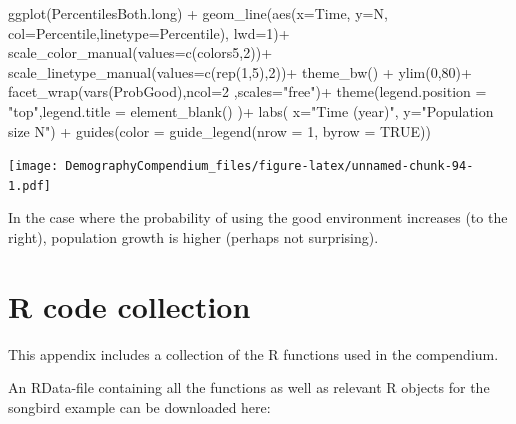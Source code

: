 \documentclass[
]{book}
\newenvironment{Shaded}{\begin{snugshade}}{\end{snugshade}}
\newcommand{\AttributeTok}[1]{\textcolor[rgb]{0.77,0.63,0.00}{#1}}
\newcommand{\ConstantTok}[1]{\textcolor[rgb]{0.00,0.00,0.00}{#1}}
\newcommand{\DecValTok}[1]{\textcolor[rgb]{0.00,0.00,0.81}{#1}}
\newcommand{\FunctionTok}[1]{\textcolor[rgb]{0.00,0.00,0.00}{#1}}
\newcommand{\NormalTok}[1]{#1}
\newcommand{\SpecialCharTok}[1]{\textcolor[rgb]{0.00,0.00,0.00}{#1}}
\newcommand{\StringTok}[1]{\textcolor[rgb]{0.31,0.60,0.02}{#1}}
\begin{document}
\begin{Shaded}
\begin{Highlighting}[]
\FunctionTok{ggplot}\NormalTok{(PercentilesBoth.long) }\SpecialCharTok{+} 
  \FunctionTok{geom\_line}\NormalTok{(}\FunctionTok{aes}\NormalTok{(}\AttributeTok{x=}\NormalTok{Time, }\AttributeTok{y=}\NormalTok{N, }\AttributeTok{col=}\NormalTok{Percentile,}\AttributeTok{linetype=}\NormalTok{Percentile), }\AttributeTok{lwd=}\DecValTok{1}\NormalTok{)}\SpecialCharTok{+}
  \FunctionTok{scale\_color\_manual}\NormalTok{(}\AttributeTok{values=}\FunctionTok{c}\NormalTok{(colors5,}\DecValTok{2}\NormalTok{))}\SpecialCharTok{+}
   \FunctionTok{scale\_linetype\_manual}\NormalTok{(}\AttributeTok{values=}\FunctionTok{c}\NormalTok{(}\FunctionTok{rep}\NormalTok{(}\DecValTok{1}\NormalTok{,}\DecValTok{5}\NormalTok{),}\DecValTok{2}\NormalTok{))}\SpecialCharTok{+}
  \FunctionTok{theme\_bw}\NormalTok{() }\SpecialCharTok{+}
  \FunctionTok{ylim}\NormalTok{(}\DecValTok{0}\NormalTok{,}\DecValTok{80}\NormalTok{)}\SpecialCharTok{+}
  \FunctionTok{facet\_wrap}\NormalTok{(}\FunctionTok{vars}\NormalTok{(ProbGood),}\AttributeTok{ncol=}\DecValTok{2}\NormalTok{ ,}\AttributeTok{scales=}\StringTok{"free"}\NormalTok{)}\SpecialCharTok{+}
   \FunctionTok{theme}\NormalTok{(}\AttributeTok{legend.position =} \StringTok{"top"}\NormalTok{,}\AttributeTok{legend.title =} \FunctionTok{element\_blank}\NormalTok{() )}\SpecialCharTok{+}
  \FunctionTok{labs}\NormalTok{( }\AttributeTok{x=}\StringTok{"Time (year)"}\NormalTok{, }\AttributeTok{y=}\StringTok{"Population size N"}\NormalTok{) }\SpecialCharTok{+}
   \FunctionTok{guides}\NormalTok{(}\AttributeTok{color =} \FunctionTok{guide\_legend}\NormalTok{(}\AttributeTok{nrow =} \DecValTok{1}\NormalTok{, }\AttributeTok{byrow =} \ConstantTok{TRUE}\NormalTok{))}
\end{Highlighting}
\end{Shaded}

\texttt{[image: DemographyCompendium\_files/figure-latex/unnamed-chunk-94-1.pdf]}

In the case where the probability of using the good environment increases (to the right), population growth is higher (perhaps not surprising).

\hypertarget{s07-Code-Collection}{%
\chapter{R code collection}\label{s07-Code-Collection}}

This appendix includes a collection of the R functions used in the compendium.

An RData-file containing all the functions as well as relevant R objects for the songbird example can be downloaded here:
\end{document}
